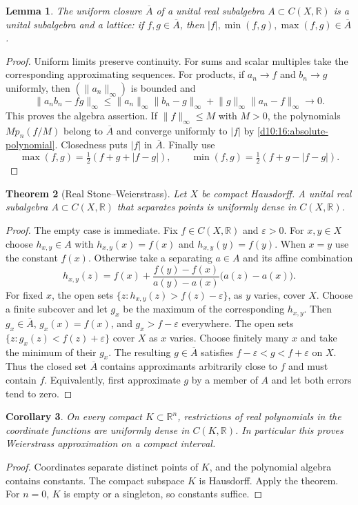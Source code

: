 \documentclass[11pt,oneside,openany]{book}
\newtheorem{theorem}{Theorem}[chapter]
\newtheorem{lemma}[theorem]{Lemma}
\newtheorem{corollary}[theorem]{Corollary}
\theoremstyle{definition}
\theoremstyle{remark}
\newcommand{\R}{\mathbb R}\newcommand{\C}{\mathbb C}
\newcommand{\eps}{\varepsilon}
\newcommand{\norm}[1]{\lVert#1\rVert}
\begin{document}
\begin{lemma}\label{d10:16:closed-lattice}
The uniform closure $\overline A$ of a unital real subalgebra
$A\subset C(X,\R)$ is a unital subalgebra and a lattice:
if $f,g\in\overline A$, then $|f|,\min(f,g),\max(f,g)\in\overline A$.
\end{lemma}
\begin{proof}
Uniform limits preserve continuity. For sums and scalar multiples take
the corresponding approximating sequences. For products, if
$a_n\to f$ and $b_n\to g$ uniformly, then $(\norm{a_n}_\infty)$ is
bounded and
\[
 \norm{a_nb_n-fg}_\infty
 \leq\norm{a_n}_\infty\norm{b_n-g}_\infty
           +\norm{g}_\infty\norm{a_n-f}_\infty\longrightarrow0.
\]
This proves the algebra assertion. If $\norm{f}_\infty\leq M$ with
$M>0$, the polynomials $M p_n(f/M)$ belong to $\overline A$ and
converge uniformly to $|f|$ by \cref{d10:16:absolute-polynomial}.
Closedness puts $|f|$ in $\overline A$. Finally use
\[
 \max(f,g)=\tfrac12(f+g+|f-g|),\qquad
 \min(f,g)=\tfrac12(f+g-|f-g|).
\]
\end{proof}

\begin{theorem}[Real Stone--Weierstrass]\label{d10:16:stone-weierstrass-real}
Let $X$ be compact Hausdorff. A unital real subalgebra $A\subset C(X,\R)$
that separates points is uniformly dense in $C(X,\R)$.
\end{theorem}
\begin{proof}
The empty case is immediate. Fix $f\in C(X,\R)$ and $\eps>0$.
For $x,y\in X$ choose $h_{x,y}\in A$ with
$h_{x,y}(x)=f(x)$ and $h_{x,y}(y)=f(y)$.
When $x=y$ use the constant $f(x)$. Otherwise take a separating $a\in A$
and its affine combination
\[
 h_{x,y}(z)=f(x)
       +\frac{f(y)-f(x)}{a(y)-a(x)}\bigl(a(z)-a(x)\bigr).
\]
For fixed $x$, the open sets
$\{z:h_{x,y}(z)>f(z)-\eps\}$, as $y$ varies, cover $X$.
Choose a finite subcover and let $g_x$ be the maximum of the corresponding
$h_{x,y}$. Then $g_x\in\overline A$, $g_x(x)=f(x)$, and
$g_x>f-\eps$ everywhere. The open sets
$\{z:g_x(z)<f(z)+\eps\}$ cover $X$ as $x$ varies.
Choose finitely many $x$ and take the minimum of their $g_x$.
The resulting $g\in\overline A$ satisfies
$f-\eps<g<f+\eps$ on $X$.
Thus the closed set $\overline A$ contains approximants arbitrarily
close to $f$ and must contain $f$. Equivalently, first approximate $g$
by a member of $A$ and let both errors tend to zero.
\end{proof}

\begin{corollary}\label{d10:16:polynomial}
On every compact $K\subset\R^n$, restrictions of real polynomials in
the coordinate functions are uniformly dense in $C(K,\R)$.
In particular this proves Weierstrass approximation on a compact interval.
\end{corollary}
\begin{proof}
Coordinates separate distinct points of $K$, and the polynomial algebra
contains constants. The compact subspace $K$ is Hausdorff. Apply the theorem.
For $n=0$, $K$ is empty or a singleton, so constants suffice.
\end{proof}
\end{document}
